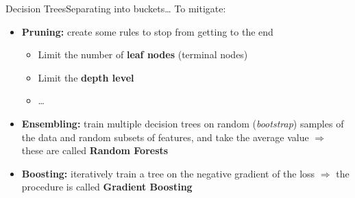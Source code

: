 \begin{frame}{Decision Trees}{Separating into buckets\dots}
    To mitigate:

    \vfill

    \begin{itemize}
        \item \textbf{Pruning:} create some rules to stop from getting to the end
              \begin{itemize}
                  \item Limit the number of \textbf{leaf nodes} (terminal nodes)
                  \item Limit the \textbf{depth level}
                  \item \dots
              \end{itemize}
        \item \textbf{Ensembling:} train multiple decision trees on random (\emph{bootstrap}) samples of the data and random subsets of features, and take the average value $\Rightarrow$ these are called \textbf{Random Forests}
        \item \textbf{Boosting:} iteratively train a tree on the negative gradient of the loss $\Rightarrow$ the procedure is called \textbf{Gradient Boosting}
    \end{itemize}

    \vfill
\end{frame}

